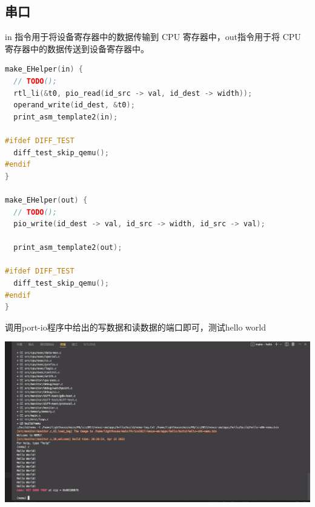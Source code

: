 \documentclass[UTF8,a4paper,10pt]{ctexart}
\begin{document}
\subsection{串口}
in 指令用于将设备寄存器中的数据传输到 CPU 寄存器中，out指令用于将 CPU 寄存器中的数据传送到设备寄存器中。
\begin{lstlisting}[language = C]
make_EHelper(in) {
  // TODO();
  rtl_li(&t0, pio_read(id_src -> val, id_dest -> width));
  operand_write(id_dest, &t0);
  print_asm_template2(in);

#ifdef DIFF_TEST
  diff_test_skip_qemu();
#endif
}

make_EHelper(out) {
  // TODO();
  pio_write(id_dest -> val, id_src -> width, id_src -> val);

  print_asm_template2(out);

#ifdef DIFF_TEST
  diff_test_skip_qemu();
#endif
}
\end{lstlisting}
调用port-io程序中给出的写数据和读数据的端口即可，测试hello world
\begin{center}
  \includegraphics*[scale = 0.25]{hello world.png}
\end{center}
\end{document}
